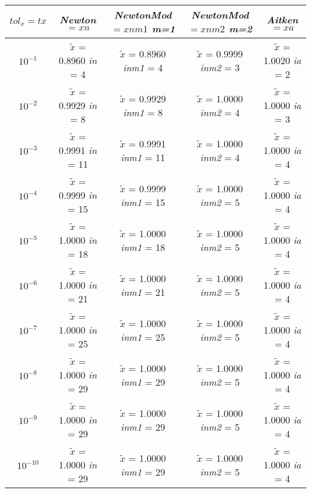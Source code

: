 \begin{center}
	\begin{tabular}{|c|c|c|c|c|}
		\hline
			$tol_x=tx$ & \textit{Newton}$=xn$ & \textit{NewtonMod$=xnm1$ m=1} & \textit{NewtonMod$=xnm2$ m=2} & \textit{Aitken}$=xa$ \\
		\hline
			$10^{-1}$ & $\tilde{x}$ = 0.8960 \quad \textit{in} = 4 & $\tilde{x}$ = 0.8960 \quad \textit{inm1} = 4 & $\tilde{x}$ = 0.9999 \quad \textit{inm2} = 3 & $\tilde{x}$ = 1.0020 \quad \textit{ia} = 2\\
			$10^{-2}$ & $\tilde{x}$ = 0.9929 \quad \textit{in} = 8 & $\tilde{x}$ = 0.9929 \quad \textit{inm1} = 8 & $\tilde{x}$ = 1.0000 \quad \textit{inm2} = 4 & $\tilde{x}$ = 1.0000 \quad \textit{ia} = 3\\
			$10^{-3}$ & $\tilde{x}$ = 0.9991 \quad \textit{in} = 11 & $\tilde{x}$ = 0.9991 \quad \textit{inm1} = 11 & $\tilde{x}$ = 1.0000 \quad \textit{inm2} = 4 & $\tilde{x}$ = 1.0000 \quad \textit{ia} = 4\\
			$10^{-4}$ & $\tilde{x}$ = 0.9999 \quad \textit{in} = 15 & $\tilde{x}$ = 0.9999 \quad \textit{inm1} = 15 & $\tilde{x}$ = 1.0000 \quad \textit{inm2} = 5 & $\tilde{x}$ = 1.0000 \quad \textit{ia} = 4\\
			$10^{-5}$ & $\tilde{x}$ = 1.0000 \quad \textit{in} = 18 & $\tilde{x}$ = 1.0000 \quad \textit{inm1} = 18 & $\tilde{x}$ = 1.0000 \quad \textit{inm2} = 5 & $\tilde{x}$ = 1.0000 \quad \textit{ia} = 4\\
			$10^{-6}$ & $\tilde{x}$ = 1.0000 \quad \textit{in} = 21 & $\tilde{x}$ = 1.0000 \quad \textit{inm1} = 21 & $\tilde{x}$ = 1.0000 \quad \textit{inm2} = 5 & $\tilde{x}$ = 1.0000 \quad \textit{ia} = 4\\
			$10^{-7}$ & $\tilde{x}$ = 1.0000 \quad \textit{in} = 25 & $\tilde{x}$ = 1.0000 \quad \textit{inm1} = 25 & $\tilde{x}$ = 1.0000 \quad \textit{inm2} = 5 & $\tilde{x}$ = 1.0000 \quad \textit{ia} = 4\\
			$10^{-8}$ & $\tilde{x}$ = 1.0000 \quad \textit{in} = 29 & $\tilde{x}$ = 1.0000 \quad \textit{inm1} = 29 & $\tilde{x}$ = 1.0000 \quad \textit{inm2} = 5 & $\tilde{x}$ = 1.0000 \quad \textit{ia} = 4\\
			$10^{-9}$ & $\tilde{x}$ = 1.0000 \quad \textit{in} = 29 & $\tilde{x}$ = 1.0000 \quad \textit{inm1} = 29 & $\tilde{x}$ = 1.0000 \quad \textit{inm2} = 5 & $\tilde{x}$ = 1.0000 \quad \textit{ia} = 4\\
			$10^{-10}$ & $\tilde{x}$ = 1.0000 \quad \textit{in} = 29 & $\tilde{x}$ = 1.0000 \quad \textit{inm1} = 29 & $\tilde{x}$ = 1.0000 \quad \textit{inm2} = 5 & $\tilde{x}$ = 1.0000 \quad \textit{ia} = 4\\

\end{tabular}
\end{center}

